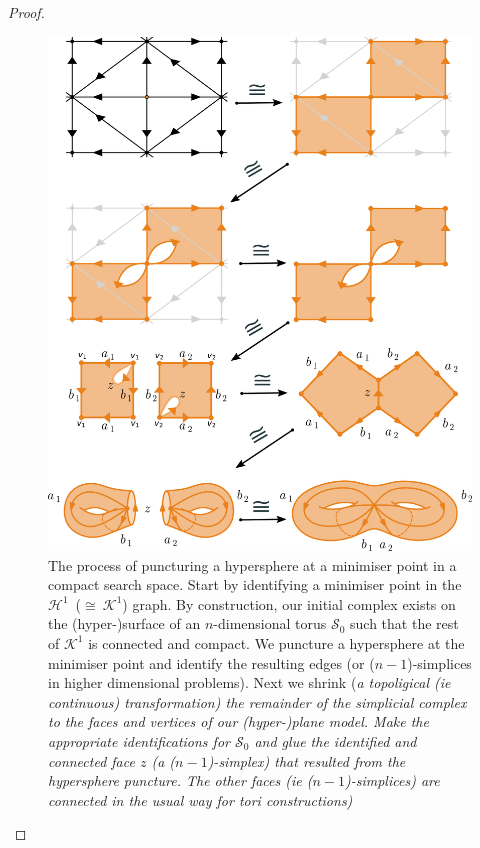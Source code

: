 \begin{proof}
\begin{figure} 
\centerline{\includegraphics[scale=0.5]{./stori_complete.pdf}}
{\caption{The process of puncturing a hypersphere at a minimiser point in a compact search space. Start by identifying a minimiser point in the $\mathcal{H}^1$~($\cong~\mathcal{K}^1$) graph. By construction, our initial complex exists on the (hyper-)surface of an $n$-dimensional torus $\mathcal{S}_0$ such that the rest of $\mathcal{K}^1$ is connected and compact. We puncture a hypersphere at the minimiser point and identify the resulting edges (or ($n-1$)-simplices in higher dimensional problems). Next we shrink (\it a topoligical (ie continuous) transformation\normalfont) the remainder of the simplicial complex to the faces and vertices of our (hyper-)plane model. Make the appropriate identifications for $\mathcal{S}_0$ and glue the identified and connected face $z$ (a ($n-1$)-simplex) that resulted from the hypersphere puncture. The other faces (ie ($n-1$)-simplices) are connected in the usual way for tori constructions)\label{fig:stori}}}
\end{figure}


\end{proof}
